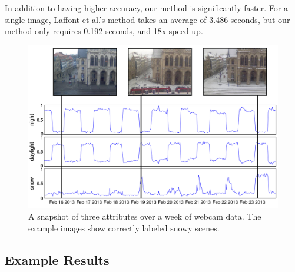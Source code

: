 \documentclass[10pt,twocolumn,letterpaper]{article}
\newcommand{\tblref}[1]{Table~\ref{tbl:#1}}
\begin{document}

In addition to having higher accuracy, our method is significantly faster.  For
a single image, Laffont et al.'s method takes an average of 3.486 seconds, but
our method only requires 0.192 seconds, and 18x speed up. 

\begin{figure}[t]
	\centering
		\includegraphics[width=\linewidth, trim= 5mm 15mm 0mm 10mm]{figs/attr_compare.pdf}
		\caption{A snapshot of three attributes over a week of webcam data.
             The example images show correctly labeled snowy scenes.}
		\label{fig:attrcmp}
\end{figure}

\subsection{Example Results}
\end{document}

